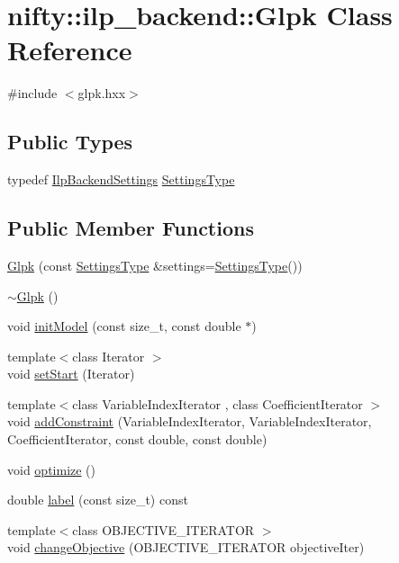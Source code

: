 \hypertarget{classnifty_1_1ilp__backend_1_1Glpk}{}\section{nifty\+:\+:ilp\+\_\+backend\+:\+:Glpk Class Reference}
\label{classnifty_1_1ilp__backend_1_1Glpk}


{\ttfamily \#include $<$glpk.\+hxx$>$}

\subsection*{Public Types}
\begin{DoxyCompactItemize}
\item 
typedef \hyperlink{structnifty_1_1ilp__backend_1_1IlpBackendSettings}{Ilp\+Backend\+Settings} \hyperlink{classnifty_1_1ilp__backend_1_1Glpk_a8f3191eb733e6a2f08f82adceae32365}{Settings\+Type}
\end{DoxyCompactItemize}
\subsection*{Public Member Functions}
\begin{DoxyCompactItemize}
\item 
\hyperlink{classnifty_1_1ilp__backend_1_1Glpk_a31b71a008ab6c3c16e60a17fbfc8822d}{Glpk} (const \hyperlink{classnifty_1_1ilp__backend_1_1Glpk_a8f3191eb733e6a2f08f82adceae32365}{Settings\+Type} \&settings=\hyperlink{classnifty_1_1ilp__backend_1_1Glpk_a8f3191eb733e6a2f08f82adceae32365}{Settings\+Type}())
\item 
\hyperlink{classnifty_1_1ilp__backend_1_1Glpk_a9696f83fd9a1688bcdf5a05b84c03976}{$\sim$\+Glpk} ()
\item 
void \hyperlink{classnifty_1_1ilp__backend_1_1Glpk_a82a16f1598798e5935d4b56a692d3b5a}{init\+Model} (const size\+\_\+t, const double $\ast$)
\item 
{\footnotesize template$<$class Iterator $>$ }\\void \hyperlink{classnifty_1_1ilp__backend_1_1Glpk_a7d71ee633ecc892e6d2e904a30604394}{set\+Start} (Iterator)
\item 
{\footnotesize template$<$class Variable\+Index\+Iterator , class Coefficient\+Iterator $>$ }\\void \hyperlink{classnifty_1_1ilp__backend_1_1Glpk_a756aac8075dfd7957e0b90e27f1b141d}{add\+Constraint} (Variable\+Index\+Iterator, Variable\+Index\+Iterator, Coefficient\+Iterator, const double, const double)
\item 
void \hyperlink{classnifty_1_1ilp__backend_1_1Glpk_a2e66c98281cb549ee477d58fbd3b8374}{optimize} ()
\item 
double \hyperlink{classnifty_1_1ilp__backend_1_1Glpk_a7720302149ac1d1df4207854a3f91d03}{label} (const size\+\_\+t) const
\item 
{\footnotesize template$<$class O\+B\+J\+E\+C\+T\+I\+V\+E\+\_\+\+I\+T\+E\+R\+A\+T\+OR $>$ }\\void \hyperlink{classnifty_1_1ilp__backend_1_1Glpk_a31c379a5553eb4fd87a56e71ac589a80}{change\+Objective} (O\+B\+J\+E\+C\+T\+I\+V\+E\+\_\+\+I\+T\+E\+R\+A\+T\+OR objective\+Iter)
\end{DoxyCompactItemize}
